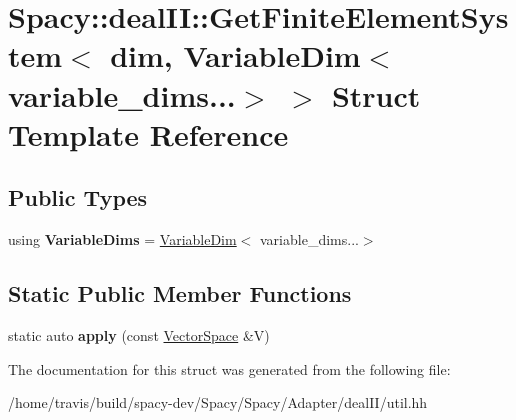 \hypertarget{structSpacy_1_1dealII_1_1GetFiniteElementSystem_3_01dim_00_01VariableDim_3_01variable__dims_8_8_8_4_01_4}{\section{Spacy\-:\-:deal\-I\-I\-:\-:Get\-Finite\-Element\-System$<$ dim, Variable\-Dim$<$ variable\-\_\-dims...$>$ $>$ Struct Template Reference}
\label{structSpacy_1_1dealII_1_1GetFiniteElementSystem_3_01dim_00_01VariableDim_3_01variable__dims_8_8_8_4_01_4}
}
\subsection*{Public Types}
\begin{DoxyCompactItemize}
\item 
\hypertarget{structSpacy_1_1dealII_1_1GetFiniteElementSystem_3_01dim_00_01VariableDim_3_01variable__dims_8_8_8_4_01_4_a384966ab2312c0b017d9f6b5bf6a9581}{using {\bfseries Variable\-Dims} = \hyperlink{structSpacy_1_1dealII_1_1VariableDim}{Variable\-Dim}$<$ variable\-\_\-dims...$>$}\label{structSpacy_1_1dealII_1_1GetFiniteElementSystem_3_01dim_00_01VariableDim_3_01variable__dims_8_8_8_4_01_4_a384966ab2312c0b017d9f6b5bf6a9581}

\end{DoxyCompactItemize}
\subsection*{Static Public Member Functions}
\begin{DoxyCompactItemize}
\item 
\hypertarget{structSpacy_1_1dealII_1_1GetFiniteElementSystem_3_01dim_00_01VariableDim_3_01variable__dims_8_8_8_4_01_4_a288817e6c9d6b657cbe1963660a391ae}{static auto {\bfseries apply} (const \hyperlink{classSpacy_1_1VectorSpace}{Vector\-Space} \&V)}\label{structSpacy_1_1dealII_1_1GetFiniteElementSystem_3_01dim_00_01VariableDim_3_01variable__dims_8_8_8_4_01_4_a288817e6c9d6b657cbe1963660a391ae}

\end{DoxyCompactItemize}


The documentation for this struct was generated from the following file\-:\begin{DoxyCompactItemize}
\item 
/home/travis/build/spacy-\/dev/\-Spacy/\-Spacy/\-Adapter/deal\-I\-I/util.\-hh\end{DoxyCompactItemize}
